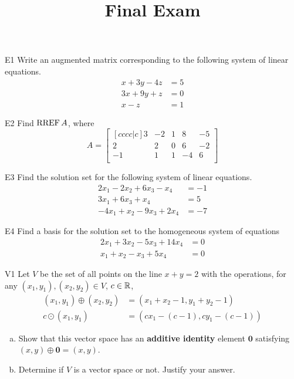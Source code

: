 \documentclass{sbgLAexam}
\title{Final Exam}
\begin{document}
\begin{problem}{E1}
Write an augmented matrix corresponding to the following system of linear equations.
\begin{align*}
x+3y-4z &= 5 \\
3x+9y+z &= 0 \\
x-z &= 1
\end{align*}
\end{problem}

\begin{problem}{E2}
Find \(\operatorname{RREF} A\), where
\[
  A =
  \begin{bmatrix}[cccc|c]
    3 & -2 & 1 & 8 & -5 \\
    2 & 2 & 0 & 6 & -2 \\
    -1 & 1 & 1 & -4 & 6 \\
  \end{bmatrix}
\]
\end{problem}
\newpage

\begin{problem}{E3}
Find the solution set for the following system of linear equations.
\begin{align*}
2x_1-2x_2+6x_3-x_4 &=-1 \\
3x_1+6x_3+x_4 &= 5 \\
-4x_1+x_2-9x_3+2x_4&=-7
\end{align*}
\end{problem}

\begin{problem}{E4}
Find a basis for the solution set to the homogeneous system of equations
\begin{align*}
2x_1+3x_2-5x_3+14x_4 &= 0\\
x_1+x_2-x_3+5x_4 &= 0
\end{align*}
\end{problem}
\newpage

\begin{problem}{V1}
Let $V$ be the set of all points on the line $x+y=2$ with the operations, for any $(x_1,y_1), (x_2,y_2) \in V$, $c \in \mathbb{R}$,
\begin{align*}
(x_1,y_1) \oplus (x_2,y_2) &= (x_1+x_2-1,y_1+y_2-1) \\
c \odot (x_1,y_1) &= (cx_1-(c-1), cy_1-(c-1))
\end{align*}
\begin{enumerate}[(a)]
\item Show that this vector space has an \textbf{additive identity} element
      \(\mathbf{0}\) satisfying \((x,y)\oplus\mathbf{0}=(x,y)\).
\item Determine if $V$ is a vector space or not.  Justify your answer.
\end{enumerate}
\end{problem}
\end{document}
